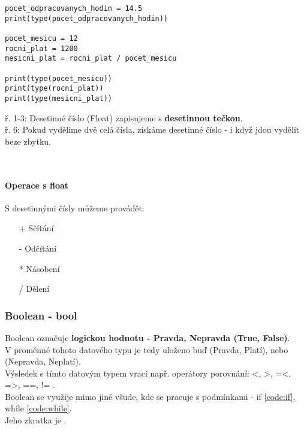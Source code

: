 \begin{minipage}[t]{.45\textwidth}
\begin{code}
\begin{verbatim}
pocet_odpracovanych_hodin = 14.5
print(type(pocet_odpracovanych_hodin))

pocet_mesicu = 12
rocni_plat = 1200
mesicni_plat = rocni_plat / pocet_mesicu

print(type(pocet_mesicu))
print(type(rocni_plat))
print(type(mesicni_plat))
\end{verbatim}

\label{code:typy_float}
\end{code}
\end{minipage}
\begin{minipage}[t]{.45\textwidth}
\vspace{2.5cm}
ř. 1-3:	Desetinné číslo (Float) zapisujeme s \textbf{desetinnou tečkou}.\\
ř. 6:	Pokud vydělíme dvě celá čísla, získáme desetinné číslo - i když jdou vydělit beze zbytku.
\end{minipage}\\ 

\paragraph{Operace s float}
S desetinnými čísly můžeme provádět:
\begin{enumerate}
\item[+] Sčítání
\item[-] Odčítání
\item[*] Násobení
\item[/] Dělení
\end{enumerate}

\subsubsection{Boolean - bool}
Boolean označuje \textbf{logickou hodnotu - Pravda, Nepravda (True, False)}.\\
V proměnné tohoto datového typu je tedy uloženo buď  (Pravda, Platí), nebo  (Nepravda, Neplatí).\\
Výsledek s tímto datovým typem vrací např. operátory porovnání: <, >, =<, =>, ==, != .\\
Boolean se využije mimo jiné všude, kde se pracuje s podmínkami - if \ref{code:if}, while \ref{code:while}.\\
Jeho zkratka je .\\

